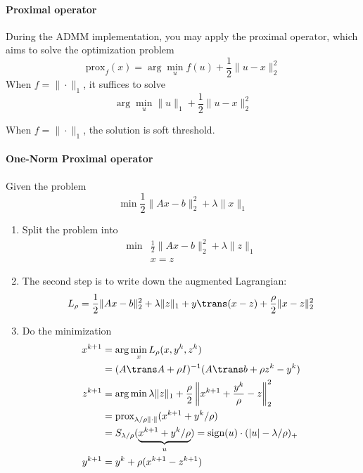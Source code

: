 \paragraph{Proximal operator}
During the ADMM implementation, you may apply the proximal operator, which aims to solve the optimization problem
\[
\mbox{prox}_f(x)=\arg\min_{u}f(u)+\frac{1}{2}\|u-x\|^2_2
\]
When $f=\|\cdot\|_1$, it suffices to solve
\[
\arg\min_{u}\|u\|_1+\frac{1}{2}\|u-x\|_2^2
\]

When $f=\|\cdot\|_1$, the solution is soft threshold.
\paragraph{One-Norm Proximal operator}

Given the problem
\[
\min\frac{1}{2}\|Ax-b\|_2^2+\lambda\|x\|_1
\]
\begin{enumerate}
\item
Split the problem into
\[
\begin{array}{ll}
\min&\frac{1}{2}\|Ax-b\|_2^2+\lambda\|z\|_1\\
&x=z
\end{array}
\]
\item
The second step is to write down the augmented Lagrangian:
\[
L_{\rho}=\frac{1}{2}\|Ax-b\|_2^2+\lambda\|z\|_1+y\trans(x-z)+\frac{\rho}{2}\|x-z\|_2^2
\]
\item
Do the minimization
\begin{align*}
x^{k+1}&=\arg\min_{x}L_\rho(x,y^k,z^k)\\
&=(A\trans A+\rho I)^{-1}(A\trans b + \rho z^k - y^k)\\
z^{k+1}&=\arg\min\lambda\|z\|_1+\frac{\rho}{2}\left\|x^{k+1}+\frac{y^k}{\rho} - z\right\|_2^2\\
&=\mbox{prox}_{\lambda/\rho \|\cdot\|}(x^{k+1} + y^k/\rho)\\
&=S_{\lambda/\rho}(\underbrace{x^{k+1} + y^k/\rho}_{u})=\mbox{sign}(u)\cdot(|u| - \lambda/\rho)_+\\
y^{k+1} &= y^k+\rho(x^{k+1} - z^{k+1})
\end{align*}



\end{enumerate}










